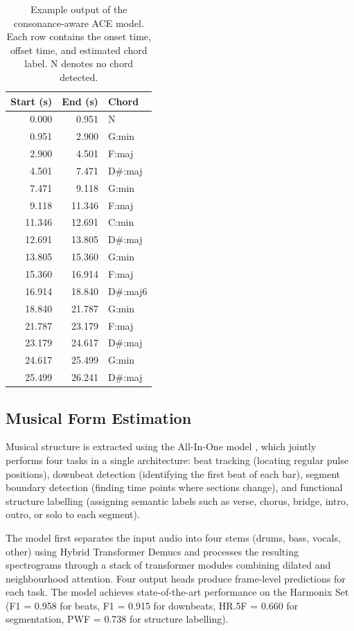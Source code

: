 \documentclass{article}
\begin{document}
\begin{table}[ht]
\centering
\small
\begin{tabular}{rrl}
\toprule
\textbf{Start (s)} & \textbf{End (s)} & \textbf{Chord} \\
\midrule
0.000 & 0.951 & N \\
0.951 & 2.900 & G:min \\
2.900 & 4.501 & F:maj \\
4.501 & 7.471 & D\#:maj \\
7.471 & 9.118 & G:min \\
9.118 & 11.346 & F:maj \\
11.346 & 12.691 & C:min \\
12.691 & 13.805 & D\#:maj \\
13.805 & 15.360 & G:min \\
15.360 & 16.914 & F:maj \\
16.914 & 18.840 & D\#:maj6 \\
18.840 & 21.787 & G:min \\
21.787 & 23.179 & F:maj \\
23.179 & 24.617 & D\#:maj \\
24.617 & 25.499 & G:min \\
25.499 & 26.241 & D\#:maj \\
\bottomrule
\end{tabular}
\caption{Example output of the consonance-aware ACE model. Each row contains the onset time, offset time, and estimated chord label. N denotes no chord detected.}
\label{tab:ace_output}
\end{table}

\subsection{Musical Form Estimation}
\label{sec:form_pipeline}
Musical structure is extracted using the All-In-One model \citep{taejun2023allinone}, which jointly performs four tasks in a single architecture: beat tracking (locating regular pulse positions), downbeat detection (identifying the first beat of each bar), segment boundary detection (finding time points where sections change), and functional structure labelling (assigning semantic labels such as verse, chorus, bridge, intro, outro, or solo to each segment).

The model first separates the input audio into four stems (drums, bass, vocals, other) using Hybrid Transformer Demucs \citep{rouard2023hybrid} and processes the resulting spectrograms through a stack of transformer modules combining dilated and neighbourhood attention. Four output heads produce frame-level predictions for each task. The model achieves state-of-the-art performance on the Harmonix Set (F1 = 0.958 for beats, F1 = 0.915 for downbeats, HR.5F = 0.660 for segmentation, PWF = 0.738 for structure labelling).
\end{document}

